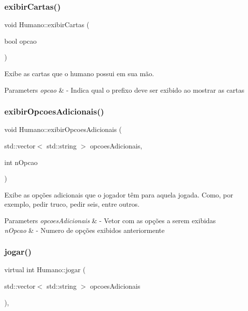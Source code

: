 \subsubsection{\texorpdfstring{exibirCartas()}{exibirCartas()}}
{\footnotesize\ttfamily void Humano\+::exibir\+Cartas (\begin{DoxyParamCaption}\item[{bool}]{opcao }\end{DoxyParamCaption})}



Exibe as cartas que o humano possui em sua mão. 


\begin{DoxyParams}{Parameters}
{\em opcao} & -\/ Indica qual o prefixo deve ser exibido ao mostrar as cartas \\
\hline
\end{DoxyParams}
\mbox{\label{class_humano_a9be2c952d918117be73a00f2c538834c}} 
\subsubsection{\texorpdfstring{exibirOpcoesAdicionais()}{exibirOpcoesAdicionais()}}
{\footnotesize\ttfamily void Humano\+::exibir\+Opcoes\+Adicionais (\begin{DoxyParamCaption}\item[{std\+::vector$<$ std\+::string $>$}]{opcoes\+Adicionais,  }\item[{int}]{n\+Opcao }\end{DoxyParamCaption})}



Exibe as opções adicionais que o jogador têm para aquela jogada. Como, por exemplo, pedir truco, pedir seis, entre outros. 


\begin{DoxyParams}{Parameters}
{\em opcoes\+Adicionais} & -\/ Vetor com as opções a serem exibidas \\
\hline
{\em n\+Opcao} & -\/ Numero de opções exibidos anteriormente \\
\hline
\end{DoxyParams}
\mbox{\label{class_humano_aad706f019b99747f9c49d915f678998d}} 
\subsubsection{\texorpdfstring{jogar()}{jogar()}}
{\footnotesize\ttfamily virtual int Humano\+::jogar (\begin{DoxyParamCaption}\item[{std\+::vector$<$ std\+::string $>$}]{opcoes\+Adicionais }\end{DoxyParamCaption})\hspace{0.3cm}{\ttfamily [override]}, {\ttfamily [virtual]}}




